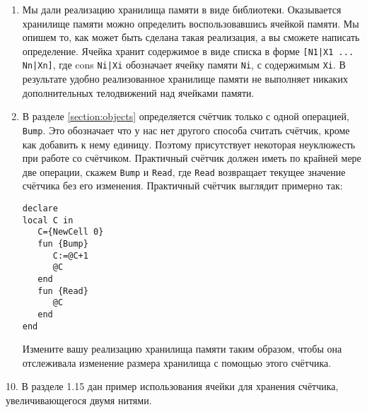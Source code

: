 \begin{enumerate}
{\begin{enumerate}
{\begin{itemize}
\item{Для вызова \lstinline|{FasterPascal N}|, обозначим через $M$ число строк, сохранённых в $S$, то есть, строки с 1 до $M$ хранятся в $S$.}

\item{Если $N>M$, то выполняется вычисление строк с $M+1$ до $N$ с последующим сохранением в $S$.}

\item{Возврат $N$-ой строки, найденной в $S$.}
\end{itemize}

Если посмотреть извне, то \lstinline|FasterPascal| это тот же \lstinline|FastPascal|, но быстрее.}

\item{Мы дали реализацию хранилища памяти в виде библиотеки. Оказывается хранилище памяти можно определить воспользовавшись ячейкой памяти. Мы опишем то, как может быть сделана такая реализация, а вы сможете написать определение. Ячейка хранит содержимое в виде списка в форме \lstinline![N1|X1 ... Nn|Xn]!, где cons \lstinline!Ni|Xi! обозначает ячейку памяти \lstinline|Ni|, с содержимым \lstinline|Xi|. В результате удобно реализованное хранилище памяти не выполняет никаких дополнительных телодвижений над ячейками памяти.}

\item{В разделе \ref{section:objects} определяется счётчик только с одной операцией, \lstinline|Bump|. Это обозначает что у нас нет другого способа считать счётчик, кроме как добавить к нему единицу. Поэтому присутствует некоторая неуклюжесть при работе со счётчиком. Практичный счётчик должен иметь по крайней мере две операции, скажем \lstinline|Bump| и \lstinline|Read|, где \lstinline|Read| возвращает текущее значение счётчика без его изменения. Практичный счётчик выглядит примерно так:

\begin{lstlisting}
declare
local C in
   C={NewCell 0}
   fun {Bump}
      C:=@C+1
      @C
   end
   fun {Read}
      @C
   end
end
  \end{lstlisting}

Измените вашу реализацию хранилища памяти таким образом, чтобы она отслеживала изменение размера хранилища с помощью этого счётчика.}
\end{enumerate}


}
\end{enumerate}






10. В разделе 1.15 дан пример использования ячейки для хранения счётчика, увеличивающегося двумя нитями.

